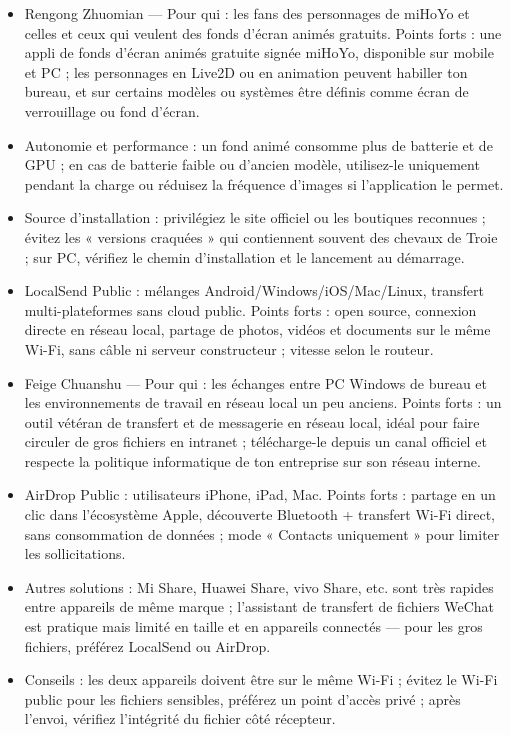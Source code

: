 \begin{itemize}
  \item Rengong Zhuomian — Pour qui : les fans des personnages de miHoYo et celles et ceux qui veulent des fonds d'écran animés gratuits. Points forts : une appli de fonds d'écran animés gratuite signée miHoYo, disponible sur mobile et PC ; les personnages en Live2D ou en animation peuvent habiller ton bureau, et sur certains modèles ou systèmes être définis comme écran de verrouillage ou fond d'écran.
  \item Autonomie et performance : un fond animé consomme plus de batterie et de GPU ; en cas de batterie faible ou d'ancien modèle, utilisez-le uniquement pendant la charge ou réduisez la fréquence d'images si l'application le permet.
  \item Source d'installation : privilégiez le site officiel ou les boutiques reconnues ; évitez les « versions craquées » qui contiennent souvent des chevaux de Troie ; sur PC, vérifiez le chemin d'installation et le lancement au démarrage.
\end{itemize}


\begin{itemize}
  \item LocalSend Public : mélanges Android/Windows/iOS/Mac/Linux, transfert multi-plateformes sans cloud public. Points forts : open source, connexion directe en réseau local, partage de photos, vidéos et documents sur le même Wi-Fi, sans câble ni serveur constructeur ; vitesse selon le routeur.
  \item Feige Chuanshu — Pour qui : les échanges entre PC Windows de bureau et les environnements de travail en réseau local un peu anciens. Points forts : un outil vétéran de transfert et de messagerie en réseau local, idéal pour faire circuler de gros fichiers en intranet ; télécharge-le depuis un canal officiel et respecte la politique informatique de ton entreprise sur son réseau interne.
  \item AirDrop Public : utilisateurs iPhone, iPad, Mac. Points forts : partage en un clic dans l'écosystème Apple, découverte Bluetooth + transfert Wi-Fi direct, sans consommation de données ; mode « Contacts uniquement » pour limiter les sollicitations.
  \item Autres solutions : Mi Share, Huawei Share, vivo Share, etc. sont très rapides entre appareils de même marque ; l'assistant de transfert de fichiers WeChat est pratique mais limité en taille et en appareils connectés — pour les gros fichiers, préférez LocalSend ou AirDrop.
  \item Conseils : les deux appareils doivent être sur le même Wi-Fi ; évitez le Wi-Fi public pour les fichiers sensibles, préférez un point d'accès privé ; après l'envoi, vérifiez l'intégrité du fichier côté récepteur.
\end{itemize}

